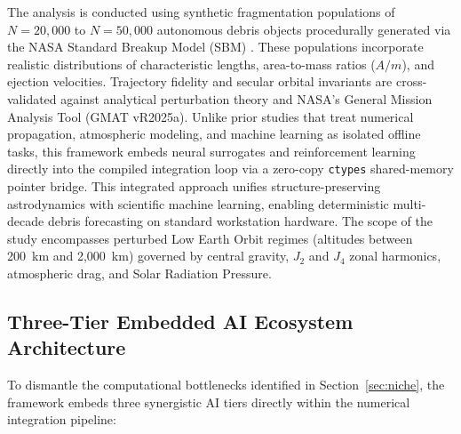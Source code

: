 The analysis is conducted using synthetic fragmentation populations of $N = 20,000$ to $N = 50,000$ autonomous debris objects procedurally generated via the NASA Standard Breakup Model (SBM) \cite{johnson_nasas_2001}. These populations incorporate realistic distributions of characteristic lengths, area-to-mass ratios ($A/m$), and ejection velocities. Trajectory fidelity and secular orbital invariants are cross-validated against analytical perturbation theory and NASA's General Mission Analysis Tool (GMAT vR2025a). Unlike prior studies that treat numerical propagation, atmospheric modeling, and machine learning as isolated offline tasks, this framework embeds neural surrogates and reinforcement learning directly into the compiled integration loop via a zero-copy \texttt{ctypes} shared-memory pointer bridge. This integrated approach unifies structure-preserving astrodynamics with scientific machine learning, enabling deterministic multi-decade debris forecasting on standard workstation hardware. The scope of the study encompasses perturbed Low Earth Orbit regimes (altitudes between 200~km and 2,000~km) governed by central gravity, $J_2$ and $J_4$ zonal harmonics, atmospheric drag, and Solar Radiation Pressure.

\subsection{Three-Tier Embedded AI Ecosystem Architecture}
\label{subsec:three_tier_ai}

To dismantle the computational bottlenecks identified in Section~\ref{sec:niche}, the framework embeds three synergistic AI tiers directly within the numerical integration pipeline:

